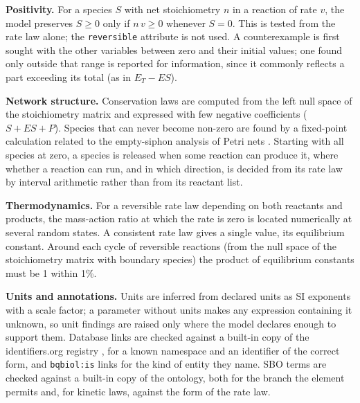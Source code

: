 \documentclass[10pt]{article}
\begin{document}
\textbf{Positivity.} For a species $S$ with net stoichiometry $n$ in a reaction of rate $v$, the model
preserves $S \ge 0$ only if $n\,v \ge 0$ whenever $S = 0$. This is tested from the rate law alone; the
\texttt{reversible} attribute is not used. A counterexample is first sought with the other variables between
zero and their initial values; one found only outside that range is reported for information, since it
commonly reflects a part exceeding its total (as in $E_T - ES$).

\textbf{Network structure.} Conservation laws are computed from the left null space of the stoichiometry
matrix \cite{sauro2004conservation} and
expressed with few negative coefficients ($S + ES + P$). Species that can never become non-zero are found by a fixed-point
calculation related to the empty-siphon analysis of Petri nets \cite{angeli2007petri}. Starting with all
species at zero, a species is released when some reaction can produce it, where whether a reaction can run,
and in which direction, is decided from its rate law by interval arithmetic rather than from its reactant list.

\textbf{Thermodynamics.} For a reversible rate law depending on both reactants and products, the mass-action
ratio at which the rate is zero is located numerically at several random states. A consistent rate law gives
a single value, its equilibrium constant. Around each cycle of reversible reactions (from the null space of the stoichiometry matrix with
boundary species) the product of equilibrium constants must be 1 within 1\%.

\textbf{Units and annotations.} Units are inferred from declared units as SI exponents with a scale factor;
a parameter without units makes any expression containing it unknown, so unit findings are raised only where
the model declares enough to support them. Database links \cite{lenovere2005miriam} are checked against a
built-in copy of the identifiers.org registry \cite{wimalaratne2018identifiers}, for a known namespace and
an identifier of the correct form, and \texttt{bqbiol:is} links for the kind of entity they name. SBO terms
\cite{courtot2011sbo} are checked against a built-in copy of the ontology, both for the branch the element
permits and, for kinetic laws, against the form of the rate law.
\end{document}
